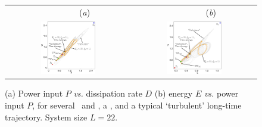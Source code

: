 \begin{figure}[t]
\begin{center}
 \begin{tabular}{cc}
        ~~~~~~~~(\textit{a})                        &   ~~~~~~~~(\textit{b}) \\
    \includegraphics[width=0.46\textwidth, clip=true]{figs_bmp/energyBalance_pst.eps}  & \includegraphics[width=0.46\textwidth, clip=true]{figs_bmp/equivaEP_pst.eps}

  \end{tabular}
\end{center}
\caption{
(a) Power input $P$ {\em vs.}
dissipation rate $D$
(b) energy $E$  {\em vs.}
power input $P$,   for several  \eqva\ and \reqva,
a \rpo, and a typical `turbulent' long-time trajectory.
System size $L=22$.
        }
\label{f:drivedrag}
\end{figure}

